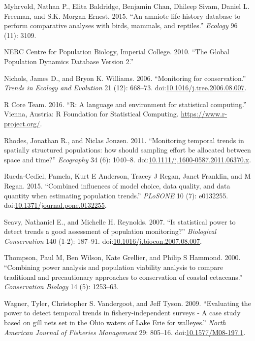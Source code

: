 \documentclass[12pt,]{article}
\begin{document}
\begin{spacing}{2}
\hypertarget{ref-Myhrvold2015}{}
Myhrvold, Nathan P., Elita Baldridge, Benjamin Chan, Dhileep Sivam,
Daniel L. Freeman, and S.K. Morgan Ernest. 2015. ``An amniote
life-history database to perform comparative analyses with birds,
mammals, and reptiles.'' \emph{Ecology} 96 (11): 3109.

\hypertarget{ref-GPDD2010}{}
NERC Centre for Population Biology, Imperial College. 2010. ``The Global
Population Dynamics Database Version 2.''

\hypertarget{ref-Nichols2006}{}
Nichols, James D., and Bryon K. Williams. 2006. ``Monitoring for
conservation.'' \emph{Trends in Ecology and Evolution} 21 (12): 668--73.
doi:\href{https://doi.org/10.1016/j.tree.2006.08.007}{10.1016/j.tree.2006.08.007}.

\hypertarget{ref-RCoreTeam2016}{}
R Core Team. 2016. ``R: A language and environment for statistical
computing.'' Vienna, Austria: R Foundation for Statistical Computing.
\url{https://www.r-project.org/}.

\hypertarget{ref-Rhodes2011}{}
Rhodes, Jonathan R., and Niclas Jonzen. 2011. ``Monitoring temporal
trends in spatially structured populations: how should sampling effort
be allocated between space and time?'' \emph{Ecography} 34 (6): 1040--8.
doi:\href{https://doi.org/10.1111/j.1600-0587.2011.06370.x}{10.1111/j.1600-0587.2011.06370.x}.

\hypertarget{ref-Rueda-Cediel2015}{}
Rueda-Cediel, Pamela, Kurt E Anderson, Tracey J Regan, Janet Franklin,
and M Regan. 2015. ``Combined influences of model choice, data quality,
and data quantity when estimating population trends.'' \emph{PLoSONE} 10
(7): e0132255.
doi:\href{https://doi.org/10.1371/journal.pone.0132255}{10.1371/journal.pone.0132255}.

\hypertarget{ref-Seavy2007}{}
Seavy, Nathaniel E., and Michelle H. Reynolds. 2007. ``Is statistical
power to detect trends a good assessment of population monitoring?''
\emph{Biological Conservation} 140 (1-2): 187--91.
doi:\href{https://doi.org/10.1016/j.biocon.2007.08.007}{10.1016/j.biocon.2007.08.007}.

\hypertarget{ref-Thompson2000}{}
Thompson, Paul M, Ben Wilson, Kate Grellier, and Philip S Hammond. 2000.
``Combining power analysis and population viability analysis to compare
traditional and precautionary approaches to conservation of coastal
cetaceans.'' \emph{Conservation Biology} 14 (5): 1253--63.

\hypertarget{ref-Wagner2009}{}
Wagner, Tyler, Christopher S. Vandergoot, and Jeff Tyson. 2009.
``Evaluating the power to detect temporal trends in fishery-independent
surveys - A case study based on gill nets set in the Ohio waters of Lake
Erie for walleyes.'' \emph{North American Journal of Fisheries
Management} 29: 805--16.
doi:\href{https://doi.org/10.1577/M08-197.1}{10.1577/M08-197.1}.


\end{spacing}
\end{document}
